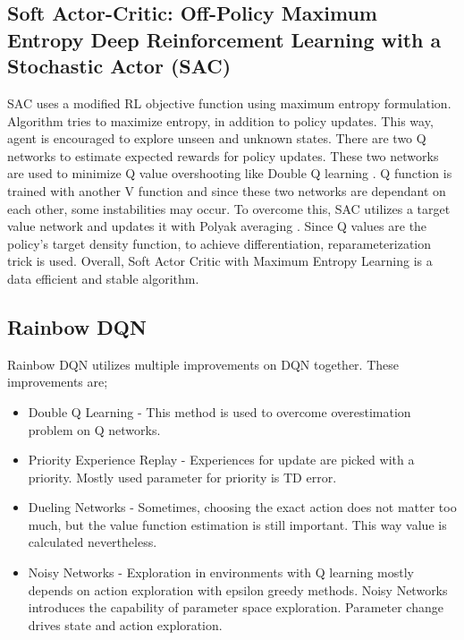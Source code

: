 \documentclass[conference]{IEEEtran}
\begin{document}
\subsection{Soft Actor-Critic: Off-Policy Maximum Entropy Deep Reinforcement Learning with a Stochastic Actor (SAC) \cite{haarnoja2018soft} \cite{haarnoja2018soft2}}
SAC uses a modified RL objective function using maximum entropy formulation. Algorithm tries to maximize entropy, in addition to policy updates. This way, agent is encouraged to explore unseen and unknown states. There are two Q networks to estimate expected rewards for policy updates. These two networks are used to minimize Q value overshooting like Double Q learning \cite{van2016deep}. Q function is trained with another V function and since these two networks are dependant on each other, some instabilities may occur. To overcome this, SAC utilizes a target value network and updates it with Polyak averaging \cite{polyak1992acceleration}. Since Q values are the policy's target density function, to achieve differentiation, reparameterization trick is used. Overall, Soft Actor Critic with Maximum Entropy Learning is a data efficient and stable algorithm.

\subsection{Rainbow DQN \cite{hessel2018rainbow}}
Rainbow DQN utilizes multiple improvements on DQN \cite{mnih2015human} together. These improvements are;

\begin{itemize}
    \item Double Q Learning \cite{van2016deep} - This method is used to overcome overestimation problem on Q networks.
    \item Priority Experience Replay \cite{schaul2015prioritized} - Experiences for update are picked with a priority. Mostly used parameter for priority is TD error.
    \item Dueling Networks \cite{wang2015dueling} - Sometimes, choosing the exact action does not matter too much, but the value function estimation is still important. This way value is calculated nevertheless.
    \item Noisy Networks \cite{fortunato2017noisy} - Exploration in environments with Q learning mostly depends on action exploration with epsilon greedy methods. Noisy Networks introduces the capability of parameter space exploration. Parameter change drives state and action exploration.
\end{itemize}
\end{document}
